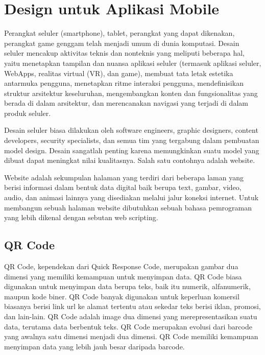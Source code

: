 \section{Design untuk Aplikasi Mobile}
\label{sec:designMobility}
Perangkat seluler (smartphone), tablet, perangkat yang dapat dikenakan, perangkat game genggam telah menjadi umum di dunia komputasi. Desain seluler mencakup aktivitas teknis dan nonteknis yang meliputi beberapa hal, yaitu menetapkan tampilan dan nuansa aplikasi seluler (termasuk aplikasi seluler, WebApps, realitas virtual (VR), dan game), membuat tata letak estetika antarmuka pengguna, menetapkan ritme interaksi pengguna, mendefinisikan struktur arsitektur keseluruhan, mengembangkan konten dan fungsionalitas yang berada di dalam arsitektur, dan merencanakan navigasi yang terjadi di dalam produk seluler. 

Desain seluler biasa dilakukan oleh software engineers, graphic designers, content developers, security specialists, dan semua tim yang tergabung dalam pembuatan model design. Desain sangatlah penting karena memungkinkan suatu model yang dibuat dapat meningkat nilai kualitasnya. Salah satu contohnya adalah website. 

Website adalah sekumpulan halaman yang terdiri dari beberapa laman yang berisi informasi dalam bentuk data digital baik berupa text, gambar, video, audio, dan animasi lainnya yang disediakan melalui jalur koneksi internet. Untuk membangun sebuah halaman website dibutuhkan sebuah bahasa pemrograman yang lebih dikenal dengan sebutan web scripting. 


\subsection{QR Code}
QR Code, kependekan dari Quick Response Code, merupakan gambar dua dimensi yang memiliki kemampuan untuk menyimpan data. QR Code biasa digunakan untuk menyimpan data berupa teks, baik itu numerik, alfanumerik, maupun kode biner. QR Code banyak digunakan untuk keperluan komersil biasanya berisi link url ke alamat tertentu atau sekedar teks berisi iklan, promosi, dan lain-lain. QR Code adalah image dua dimensi yang merepresentasikan
suatu data, terutama data berbentuk teks. QR Code merupakan evolusi dari barcode yang awalnya satu dimensi menjadi dua dimensi. QR Code memiliki kemampuan menyimpan data yang
lebih jauh besar daripada barcode.